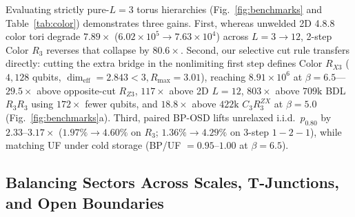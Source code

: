 \documentclass[aps,prx,reprint,superscriptaddress,nofootinbib,floatfix]{revtex4-2}
\begin{document}
Evaluating strictly pure-$L = 3$ torus hierarchies (Fig.~\ref{fig:benchmarks} and Table~\ref{tab:color}) demonstrates three gains. First, whereas unwelded 2D 4.8.8 color tori degrade $7.89\times$ ($6.02 \times 10^5 \to 7.63 \times 10^4$) across $L = 3 \to 12$, 2-step Color $R_3$ reverses that collapse by $80.6\times$. Second, our selective cut rule transfers directly: cutting the extra bridge in the nonlimiting first step defines Color $R_{X3}$ ($4{,}128$ qubits, $\dim_{\mathrm{eff}} = 2.843 < 3, R_{\max} = 3.01$), reaching $8.91 \times 10^6$ at $\beta = 6.5$---$29.5\times$ above opposite-cut $R_{Z3}$, $117\times$ above 2D $L = 12$, $803\times$ above $709\mathrm{k}$ BDL $R_3 R_3$ using $172\times$ fewer qubits, and $18.8\times$ above $422\mathrm{k}$ $C_3 R_3^{ZX}$ at $\beta = 5.0$ (Fig.~\ref{fig:benchmarks}a). Third, paired BP-OSD lifts unrelaxed i.i.d.\ $p_{0.80}$ by $2.33\text{--}3.17\times$ ($1.97\% \to 4.60\%$ on $R_3$; $1.36\% \to 4.29\%$ on 3-step $1{-}2{-}1$), while matching UF under cold storage (BP/UF $= 0.95\text{--}1.00$ at $\beta = 6.5$).

\subsection{Balancing Sectors Across Scales, T-Junctions, and Open Boundaries}
\end{document}

